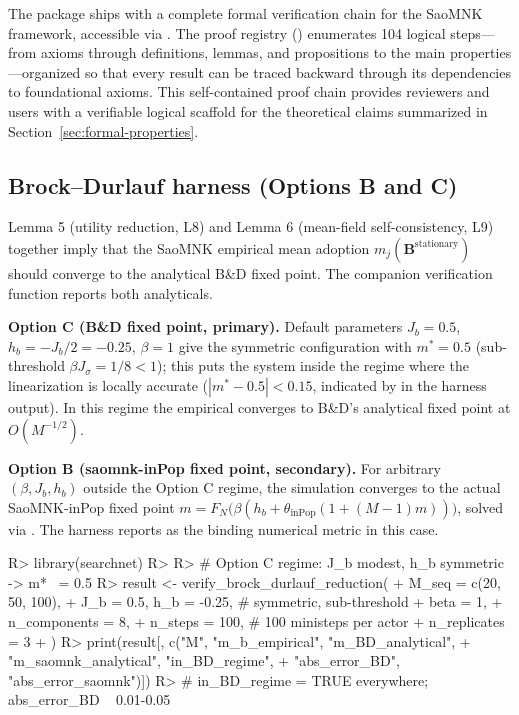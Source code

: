 \documentclass[
  article]{jss}
\begin{document}
The package ships with a complete formal verification chain for the
SaoMNK framework, accessible via . The proof
registry () enumerates 104 logical
steps---from axioms through definitions, lemmas, and propositions to the
main properties---organized so that every result can be traced backward
through its dependencies to foundational axioms. This self-contained
proof chain provides reviewers and users with a verifiable logical
scaffold for the theoretical claims summarized in
Section~\ref{sec:formal-properties}.

\subsection{Brock--Durlauf harness (Options B and
C)}\label{sec:bd-harness}

Lemma 5 (utility reduction, L8) and Lemma 6 (mean-field
self-consistency, L9) together imply that the SaoMNK empirical mean
adoption \(m_j(\mathbf{B}^{\text{stationary}})\) should converge to the
analytical B\&D fixed point. The companion verification function
 reports both analyticals.

\textbf{Option C (B\&D fixed point, primary).} Default parameters
\(J_b = 0.5\), \(h_b = -J_b/2 = -0.25\), \(\beta = 1\) give the
symmetric configuration with \(m^* = 0.5\) (sub-threshold
\(\beta J_{\sigma} = 1/8 < 1\)); this puts the system inside the regime
where the linearization is locally accurate (\(|m^* - 0.5| < 0.15\),
indicated by  in the harness output). In
this regime the empirical converges to B\&D's analytical fixed point at
\(O(M^{-1/2})\).

\textbf{Option B (saomnk-inPop fixed point, secondary).} For arbitrary
\((\beta, J_b, h_b)\) outside the Option C regime, the simulation
converges to the actual SaoMNK-inPop fixed point
\(m = F_N\bigl(\beta(h_b + \theta_{\mathrm{inPop}}(1 + (M-1)m))\bigr)\),
solved via . The harness
reports  as the binding numerical metric in
this case.

\begin{CodeChunk}
\begin{CodeInput}
R> library(searchnet)
R> 
R> # Option C regime: J_b modest, h_b symmetric -> m* ~= 0.5
R> result <- verify_brock_durlauf_reduction(
+   M_seq = c(20, 50, 100),
+   J_b = 0.5, h_b = -0.25,        # symmetric, sub-threshold
+   beta = 1,
+   n_components = 8,
+   n_steps = 100,                  # 100 ministeps per actor
+   n_replicates = 3
+ )
R> print(result[, c("M", "m_b_empirical", "m_BD_analytical",
+                  "m_saomnk_analytical", "in_BD_regime",
+                  "abs_error_BD", "abs_error_saomnk")])
R> # in_BD_regime = TRUE everywhere; abs_error_BD ~ 0.01-0.05
\end{CodeInput}
\end{CodeChunk}
\end{document}
